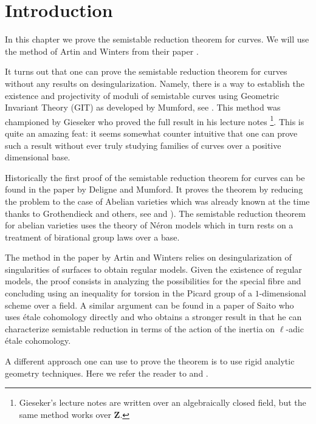 \section{Introduction}
\label{models-section-introduction}
In this chapter we prove the semistable reduction theorem for curves.
We will use the method of Artin and Winters from their paper
\cite{Artin-Winters}.

\medskip\noindent
It turns out that one can prove the semistable reduction theorem
for curves without any results on desingularization. Namely, there
is a way to establish the existence and projectivity of moduli
of semistable curves using Geometric Invariant Theory (GIT)
as developed by Mumford, see \cite{GIT}. This method was
championed by Gieseker who proved the full result in his
lecture notes \cite{Gieseker}\footnote{Gieseker's lecture notes
are written over an algebraically closed field, but the same method
works over $\mathbf{Z}$.}. This is quite an amazing
feat: it seems somewhat counter intuitive that one can
prove such a result without ever truly studying families of curves over
a positive dimensional base.

\medskip\noindent
Historically the first proof of the semistable reduction theorem
for curves can be found in the paper \cite{DM} by Deligne and Mumford.
It proves the theorem by reducing the problem to the case of
Abelian varieties which was already known at the time thanks
to Grothendieck and others, see \cite{SGA7-I} and \cite{SGA7-II}).
The semistable reduction theorem for abelian varieties uses the theory
of N\'eron models which in turn rests on a treatment of birational
group laws over a base.

\medskip\noindent
The method in the paper by Artin and Winters relies on desingularization
of singularities of surfaces to obtain regular models. Given the existence
of regular models, the proof consists in analyzing the
possibilities for the special fibre and concluding using an inequality
for torsion in the Picard group of a $1$-dimensional scheme over a field.
A similar argument can be found in a paper \cite{Saito} of Saito who uses
\'etale cohomology directly and who obtains a stronger result in that
he can characterize semistable reduction in terms of the action of
the inertia on $\ell$-adic \'etale cohomology.

\medskip\noindent
A different approach one can use to prove the theorem is to use
rigid analytic geometry techniques. Here we refer the reader to
\cite{vanderPut} and \cite{Arzdorf-Wewers}.

